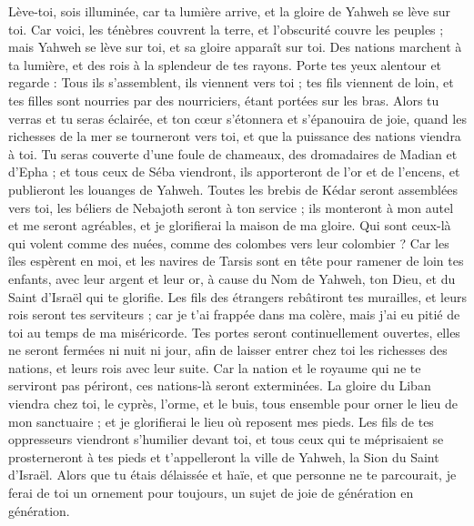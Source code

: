 \begin{multicols}{2}
\VerseOne{}Lève-toi, sois illuminée, car ta lumière arrive, et la gloire de Yahweh se lève sur toi.
Car voici, les ténèbres couvrent la terre, et l'obscurité couvre les peuples ; mais Yahweh se lève sur toi, et sa gloire apparaît sur toi.
Des nations marchent à ta lumière, et des rois à la splendeur de tes rayons.
Porte tes yeux alentour et regarde : Tous ils s'assemblent, ils viennent vers toi ; tes fils viennent de loin, et tes filles sont nourries par des nourriciers, étant portées sur les bras.
Alors tu verras et tu seras éclairée, et ton cœur s'étonnera et s'épanouira de joie, quand les richesses de la mer se tourneront vers toi, et que la puissance des nations viendra à toi.
Tu seras couverte d'une foule de chameaux, des dromadaires de Madian et d'Epha ; et tous ceux de Séba viendront, ils apporteront de l'or et de l'encens, et publieront les louanges de Yahweh.
Toutes les brebis de Kédar seront assemblées vers toi, les béliers de Nebajoth seront à ton service ; ils monteront à mon autel et me seront agréables, et je glorifierai la maison de ma gloire.
Qui sont ceux-là qui volent comme des nuées, comme des colombes vers leur colombier ?
Car les îles espèrent en moi, et les navires de Tarsis sont en tête pour ramener de loin tes enfants, avec leur argent et leur or, à cause du Nom de Yahweh, ton Dieu, et du Saint d'Israël qui te glorifie.
Les fils des étrangers rebâtiront tes murailles, et leurs rois seront tes serviteurs ; car je t'ai frappée dans ma colère, mais j'ai eu pitié de toi au temps de ma miséricorde.
Tes portes seront continuellement ouvertes, elles ne seront fermées ni nuit ni jour, afin de laisser entrer chez toi les richesses des nations, et leurs rois avec leur suite.
Car la nation et le royaume qui ne te serviront pas périront, ces nations-là seront exterminées.
La gloire du Liban viendra chez toi, le cyprès, l'orme, et le buis, tous ensemble pour orner le lieu de mon sanctuaire ; et je glorifierai le lieu où reposent mes pieds.
Les fils de tes oppresseurs viendront s'humilier devant toi, et tous ceux qui te méprisaient se prosterneront à tes pieds et t'appelleront la ville de Yahweh, la Sion du Saint d'Israël.
Alors que tu étais délaissée et haïe, et que personne ne te parcourait, je ferai de toi un ornement pour toujours, un sujet de joie de génération en génération.

\end{multicols}
